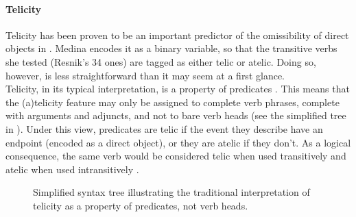 \paragraph{Telicity} Telicity has been proven to be an important predictor of the omissibility of direct objects in . Medina encodes it as a binary variable, so that the transitive verbs she tested (Resnik's 34 ones) are tagged as either telic or atelic. Doing so, however, is less straightforward than it may seem at a first glance.\\
Telicity, in its typical interpretation, is a property of predicates \parencite{Vendler1957, dowty2012word1979}. This means that the (a)telicity feature may only be assigned to complete verb phrases, complete with arguments and adjuncts, and not to bare verb heads (see the simplified tree in ). Under this view, predicates are telic if the event they describe have an endpoint (encoded as a direct object), or they are atelic if they don't. As a logical consequence, the same verb would be considered telic when used transitively and atelic when used intransitively \parencite{OlsenResnik1997, Mittwoch1982}.

\begin{figure}[htb]
\caption{Simplified syntax tree illustrating the traditional interpretation of telicity as a property of predicates, not verb heads.}
\end{figure}

